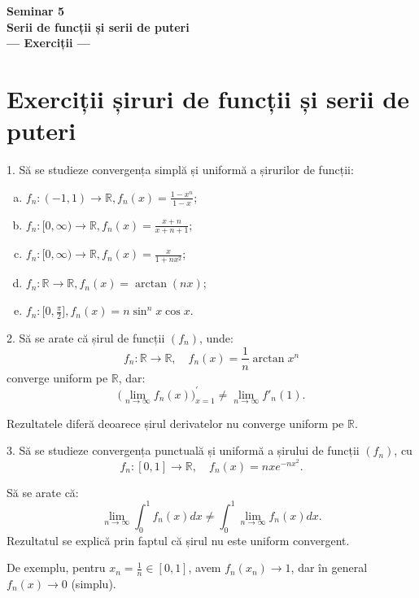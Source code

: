 \documentclass[11pt,a4paper]{article}
\newcommand\RR{\mathbb{R}}
\theoremstyle{dotless}
\theoremstyle{dotlessdr}
\begin{document}
\begin{center}
  {\large\textbf{Seminar 5 \\ Serii de funcții și serii de puteri \\ --- Exerciții ---}}
\end{center}

\vspace{2cm}

\section{Exerciții șiruri de funcții și serii de puteri}
\label{sec:exc1}


1. Să se studieze convergența simplă și uniformă a șirurilor de funcții:
\begin{enumerate}[(a)]
\item $f_n : (-1, 1) \to \RR, f_n(x) = \frac{1 - x^n}{1 - x}$;
\item $f_n : [0, \infty) \to \RR, f_n(x) = \frac{x + n}{x + n + 1}$;
\item $f_n : [0, \infty) \to \RR, f_n(x) = \frac{x}{1 + nx^2}$;
\item $f_n : \RR \to \RR, f_n(x) = \arctan (nx)$;
\item $f_n : \big[0, \frac{\pi}{2}\big], f_n(x) = n \sin^n x \cos x$.
\end{enumerate}

\vspace{1cm}

2. Să se arate că șirul de funcții $(f_n)$, unde:
\[
  f_n : \RR \to \RR, \quad f_n(x) = \frac{1}{n} \arctan x^n
\]
converge uniform pe $\RR$, dar:
\[
  \big(\lim_{n \to \infty} f_n(x)\big)^\prime_{x = 1} \neq \lim_{n \to \infty} f'_n(1).
\]

Rezultatele diferă deoarece șirul derivatelor nu converge uniform pe $\RR$.

\vspace{1cm}

3. Să se studieze convergența punctuală și uniformă a șirului de funcții $(f_n)$, cu
\[
  f_n : [0, 1] \to \RR, \quad f_n(x) = nxe^{-nx^2}.
\]

Să se arate că:
\[
  \lim_{n \to \infty} \int_0^1 f_n(x) dx \neq \int_0^1 \lim_{n \to \infty} f_n(x) dx.
\]
Rezultatul se explică prin faptul că șirul nu este uniform convergent.

De exemplu, pentru $x_n = \frac{1}{n} \in [0, 1]$, avem $f_n(x_n) \to 1$, dar
în general $f_n(x) \to 0$ (simplu).

\vspace{1cm}
\end{document}

